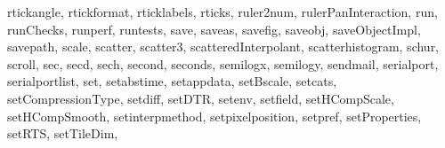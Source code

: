 {{        rtickangle,%
        rtickformat,%
        rticklabels,%
        rticks,%
        ruler2num,%
        rulerPanInteraction,%
        run,%
        runChecks,%
        runperf,%
        runtests,%
        save,%
        saveas,%
        savefig,%
        saveobj,%
        saveObjectImpl,%
        savepath,%
        scale,%
        scatter,%
        scatter3,%
        scatteredInterpolant,%
        scatterhistogram,%
        schur,%
        scroll,%
        sec,%
        secd,%
        sech,%
        second,%
        seconds,%
        semilogx,%
        semilogy,%
        sendmail,%
        serialport,%
        serialportlist,%
        set,%
        setabstime,%
        setappdata,%
        setBscale,%
        setcats,%
        setCompressionType,%
        setdiff,%
        setDTR,%
        setenv,%
        setfield,%
        setHCompScale,%
        setHCompSmooth,%
        setinterpmethod,%
        setpixelposition,%
        setpref,%
        setProperties,%
        setRTS,%
        setTileDim,%
}}
